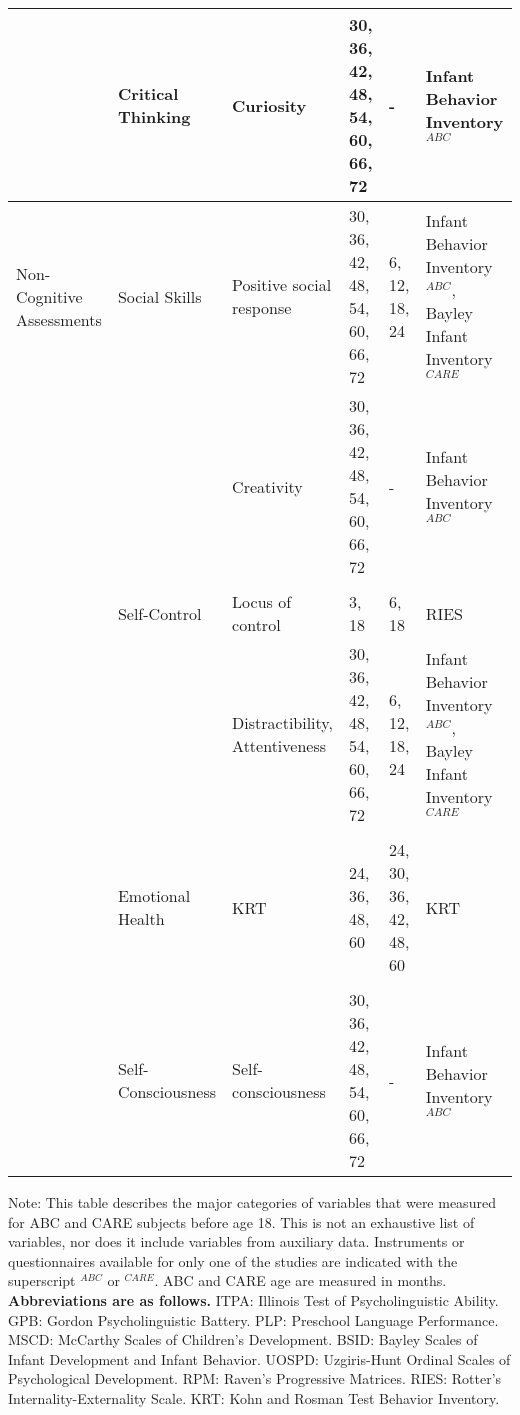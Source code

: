 \begin{sidewaystable}[H]
\begin{adjustbox}{max width=\textwidth, max height=\textheight,keepaspectratio}
\begin{threeparttable}
\begin{tabular}{L{3cm} C{3.5cm} C{4cm} C{1.5cm} C{1.5cm}  C{6cm}}
	&	Critical Thinking	&	Curiosity	&	30, 36, 42, 48, 54, 60, 66, 72	& - &	Infant Behavior Inventory$^{ABC}$	\\ \midrule
Non-Cognitive Assessments	&	Social Skills	&	Positive social response	&	30, 36, 42, 48, 54, 60, 66, 72	&	6, 12, 18, 24		&	Infant Behavior Inventory$^{ABC}$, Bayley Infant Inventory$^{CARE}$	\\
	&		&	Creativity	&	30, 36, 42, 48, 54, 60, 66, 72	&	- 	&	Infant Behavior Inventory$^{ABC}$	\\
	&	\\
	&	Self-Control	&	Locus of control	&	3, 18	&	6, 18	& 	RIES	\\
	&		&	Distractibility, Attentiveness	&	30, 36, 42, 48, 54, 60, 66, 72	&	6, 12, 18, 24		&	Infant Behavior Inventory$^{ABC}$, Bayley Infant Inventory$^{CARE}$	\\
	&	\\
	&	Emotional Health	&	KRT	&	24, 36, 48, 60	&	24, 30, 36, 42, 48, 60	&	KRT	\\
	&	\\
	&	Self-Consciousness	&	Self-consciousness	&	30, 36, 42, 48, 54, 60, 66, 72	&	-	&	Infant Behavior Inventory$^{ABC}$	\\
\hline \hline
\end{tabular}
\begin{tablenotes}
\tiny
\item Note: This table describes the major categories of variables that were measured for ABC and CARE subjects before age 18. This is not an exhaustive list of variables, nor does it include variables from auxiliary data.  Instruments or questionnaires available for only one of the studies are indicated with the superscript $^{ABC}$ or $^{CARE}$. ABC and CARE age are measured in months. \textbf{Abbreviations are as follows.} ITPA: Illinois Test of Psycholinguistic Ability. GPB: Gordon Psycholinguistic Battery. PLP: Preschool Language Performance. MSCD: McCarthy Scales of Children's Development. BSID: Bayley Scales of Infant Development and Infant Behavior. UOSPD: Uzgiris-Hunt Ordinal Scales of Psychological Development. RPM: Raven's Progressive Matrices. RIES: Rotter's Internality-Externality Scale. KRT: Kohn and Rosman Test Behavior Inventory.
\end{tablenotes}
\end{threeparttable}
\end{adjustbox}
\end{sidewaystable}




